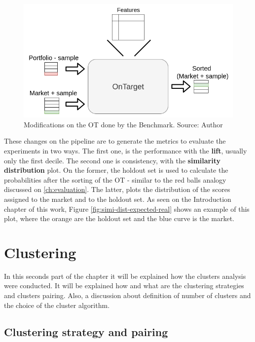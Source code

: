 \begin{figure}[h]
   \centering
   \includegraphics[width=\linewidth]{fig/ch3-ot-benchmark-blocks.png}
   \caption{Modifications on the OT done by the Benchmark. Source: Author}
   \label{fig:ot-benchmark-blocks}
\end{figure}

These changes on the pipeline are to generate the metrics to evaluate the experiments in two ways. The first one, is the performance with the \textbf{lift}, usually only the first decile. The second one is consistency, with the \textbf{similarity distribution} plot. On the former, the holdout set is used to calculate the probabilities after the sorting of the OT - similar to the red balls analogy discussed on \ref{ch:evaluation}. The latter, plots the distribution of the scores assigned to the market and to the holdout set. As seen on the Introduction chapter of this work, Figure \ref{fig:simi-dist-expected-real} shows an example of this plot, where the orange are the holdout set and the blue curve is the market.

\section{Clustering}

In this seconds part of the chapter it will be explained how the clusters analysis were conducted. It will be explained how and what are the clustering strategies and clusters pairing. Also, a discussion about definition of number of clusters and the choice of the cluster algorithm.

\subsection{Clustering strategy and pairing}

